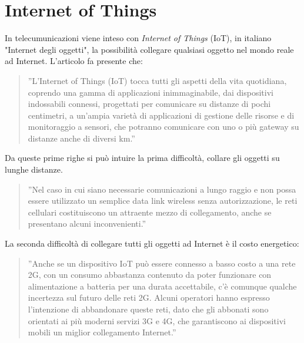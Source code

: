 \documentclass[a4paper]{report} %
\begin{document}
\section{Internet of Things}
In telecumunicazioni viene inteso con \textit{Internet of Things} (IoT), in italiano "Internet degli oggetti", la possibilità collegare qualsiasi oggetto nel mondo reale ad Internet.
L'articolo \cite{art:rif.20} fa presente che:
\begin{quote}
	''L'Internet of Things (IoT) tocca tutti gli aspetti della vita quotidiana, coprendo una gamma di applicazioni inimmaginabile, dai dispositivi indossabili connessi, progettati per comunicare su distanze di pochi centimetri, a un'ampia varietà di applicazioni di gestione delle risorse e di monitoraggio a sensori, che potranno comunicare con uno o più gateway su distanze anche di diversi km.''
\end{quote}
Da queste prime righe si può intuire la prima difficoltà, collare gli oggetti su lunghe distanze.
\begin{quote}
	''Nel caso in cui siano necessarie comunicazioni a lungo raggio e non possa essere utilizzato un semplice data link wireless senza autorizzazione, le reti cellulari costituiscono un attraente mezzo di collegamento, anche se presentano alcuni inconvenienti.''
\end{quote}
La seconda difficoltà di collegare tutti gli oggetti ad Internet è il costo energetico:
\begin{quote}
	 ''Anche se un dispositivo IoT può essere connesso a basso costo a una rete 2G, con un consumo abbastanza contenuto da poter funzionare con alimentazione a batteria per una durata accettabile, c'è comunque qualche incertezza sul futuro delle reti 2G. Alcuni operatori hanno espresso l'intenzione di abbandonare queste reti, dato che gli abbonati sono orientati ai più moderni servizi 3G e 4G, che garantiscono ai dispositivi mobili un miglior collegamento Internet.''
\end{quote}
\end{document}
